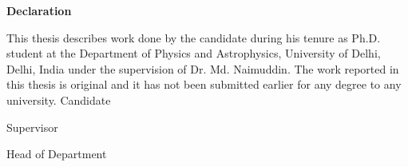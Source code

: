 \begin{center}
\textbf{\LARGE Declaration}
\end{center}
\vspace{1.5cm}
This thesis describes work done by the candidate during his tenure as Ph.D. student at the Department of Physics and Astrophysics, University of Delhi, Delhi, India under the supervision of Dr. Md. Naimuddin. The work reported in this thesis is original and it has not been submitted earlier for any degree to any university. 
\vfill
{\flushleft Candidate} \hspace{4cm} \dotfill \\

\vfill
{\flushleft Supervisor} \hspace{4cm} \dotfill \\

\vfill
{\flushleft Head of Department} \hspace{2.5cm} \dotfill \\
\vfill